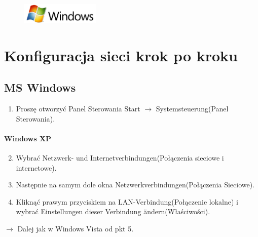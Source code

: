\documentclass[a4paper,12pt]{scrartcl}
\begin{document}
\newpage
\enlargethispage{20pt}

\begin{figure}[t!]
    \raggedleft
    \vspace{-20pt}
    \includegraphics[height=1cm,keepaspectratio]{Bilder/Windows_logo}
    \vspace{-20pt}
\end{figure}

\section*{Konfiguracja sieci krok po kroku}
\subsection*{MS Windows}
\begin{enumerate}
    \item Proszę otworzyć Panel Sterowania Start $\rightarrow$ Systemsteuerung(Panel Sterowania).
\end{enumerate}
\vspace{-15pt}
\paragraph*{Windows XP}
\begin{enumerate}
     \setcounter{enumi}{1}
     \item Wybrać Netzwerk- und Internetverbindungen(Połączenia sieciowe i internetowe).
     \item Następnie na samym dole okna Netzwerkverbindungen(Połączenia Sieciowe).
     \item Kliknąć prawym przyciskiem na LAN-Verbindung(Połączenie lokalne) i wybrać Einstellungen dieser Verbindung ändern(Właściwości).
\end{enumerate}
$\rightarrow$ Dalej jak w Windows Vista od pkt 5.
\vspace{-10pt}
\end{document}
